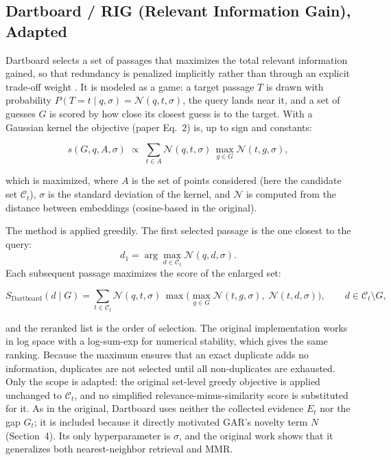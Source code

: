 \documentclass[11pt,a4paper]{article}
\begin{document}
\subsection{Dartboard / RIG (Relevant Information Gain), Adapted}

Dartboard selects a set of passages that maximizes the total relevant information gained, so that redundancy is penalized implicitly rather than through an explicit trade-off weight \citep{pickett-etal-2024-rig}. It is modeled as a game: a target passage $T$ is drawn with probability $P(T=t\mid q,\sigma)=\mathcal{N}(q,t,\sigma)$, the query lands near it, and a set of guesses $G$ is scored by how close its closest guess is to the target. With a Gaussian kernel the objective (paper Eq.~2) is, up to sign and constants:

\[
s(G,q,A,\sigma)
\;\propto\;
\sum_{t\in A}
\mathcal{N}(q,t,\sigma)\,
\max_{g\in G}\mathcal{N}(t,g,\sigma),
\]

which is maximized, where $A$ is the set of points considered (here the candidate set $\mathcal{C}_t$), $\sigma$ is the standard deviation of the kernel, and $\mathcal{N}$ is computed from the distance between embeddings (cosine-based in the original).

The method is applied greedily. The first selected passage is the one closest to the query:
\[
d_1=\arg\max_{d\in\mathcal{C}_t}\mathcal{N}(q,d,\sigma).
\]
Each subsequent passage maximizes the score of the enlarged set:

\[
S_{\mathrm{Dartboard}}(d\mid G)
=
\sum_{t\in\mathcal{C}_t}
\mathcal{N}(q,t,\sigma)\,
\max\!\Big(\max_{g\in G}\mathcal{N}(t,g,\sigma),\;\mathcal{N}(t,d,\sigma)\Big),
\qquad d\in\mathcal{C}_t\setminus G,
\]

and the reranked list is the order of selection. The original implementation works in log space with a log-sum-exp for numerical stability, which gives the same ranking. Because the maximum ensures that an exact duplicate adds no information, duplicates are not selected until all non-duplicates are exhausted. Only the scope is adapted: the original set-level greedy objective is applied unchanged to $\mathcal{C}_t$, and no simplified relevance-minus-similarity score is substituted for it. As in the original, Dartboard uses neither the collected evidence $E_t$ nor the gap $G_t$; it is included because it directly motivated GAR's novelty term $N$ (Section~4). Its only hyperparameter is $\sigma$, and the original work shows that it generalizes both nearest-neighbor retrieval and MMR.
\end{document}
